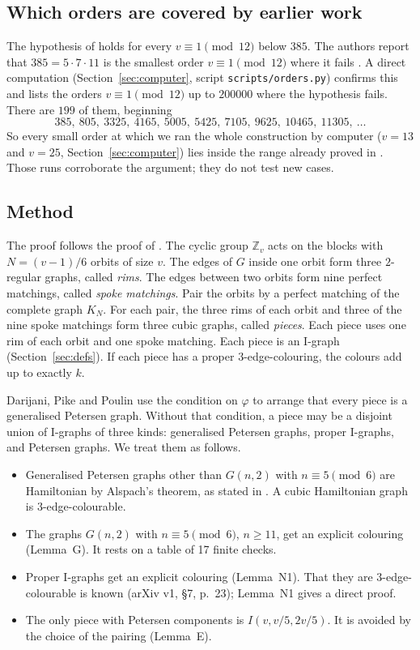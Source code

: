 \documentclass[11pt]{amsart}
\theoremstyle{plain}
\theoremstyle{definition}
\theoremstyle{remark}
\numberwithin{equation}{section}
\newcommand{\Z}{\mathbb{Z}}
\begin{document}
\subsection{Which orders are covered by earlier work}

The hypothesis of \cite[Theorem~3.1]{DPP} holds for every \(v\equiv1\pmod{12}\) below \(385\). The authors report that \(385=5\cdot7\cdot11\) is the smallest order \(v\equiv1\pmod{12}\) where it fails \cite[\S3]{DPP}. A direct computation (Section~\ref{sec:computer}, script \nolinkurl{scripts/orders.py}) confirms this and lists the orders \(v\equiv 1\pmod{12}\) up to \(200000\) where the hypothesis fails. There are \(199\) of them, beginning
\[
385,\ 805,\ 3325,\ 4165,\ 5005,\ 5425,\ 7105,\ 9625,\ 10465,\ 11305,\ \dots
\]
So every small order at which we ran the whole construction by computer (\(v=13\) and \(v=25\), Section~\ref{sec:computer}) lies inside the range already proved in \cite{DPP}. Those runs corroborate the argument; they do not test new cases.

\subsection{Method}

The proof follows the proof of \cite[Theorem~3.1]{DPP}. The cyclic group \(\Z_v\) acts on the blocks with \(N=(v-1)/6\) orbits of size \(v\). The edges of \(G\) inside one orbit form three \(2\)-regular graphs, called \emph{rims}. The edges between two orbits form nine perfect matchings, called \emph{spoke matchings}. Pair the orbits by a perfect matching of the complete graph \(K_N\). For each pair, the three rims of each orbit and three of the nine spoke matchings form three cubic graphs, called \emph{pieces}. Each piece uses one rim of each orbit and one spoke matching. Each piece is an I-graph (Section~\ref{sec:defs}). If each piece has a proper \(3\)-edge-colouring, the colours add up to exactly \(k\).

Darijani, Pike and Poulin use the condition on \(\varphi\) to arrange that every piece is a generalised Petersen graph. Without that condition, a piece may be a disjoint union of I-graphs of three kinds: generalised Petersen graphs, proper I-graphs, and Petersen graphs. We treat them as follows.
\begin{itemize}
\item Generalised Petersen graphs other than \(G(n,2)\) with \(n\equiv5\pmod6\) are Hamiltonian by Alspach's theorem, as stated in \cite[Theorem~1.1]{BP}. A cubic Hamiltonian graph is \(3\)-edge-colourable.
\item The graphs \(G(n,2)\) with \(n\equiv 5\pmod 6\), \(n\ge11\), get an explicit colouring (Lemma~G). It rests on a table of 17 finite checks.
\item Proper I-graphs get an explicit colouring (Lemma~N1). That they are \(3\)-edge-colourable is known \cite[\S7, p.~20]{BP} (arXiv v1, \S7, p.~23); Lemma~N1 gives a direct proof.
\item The only piece with Petersen components is \(I(v,v/5,2v/5)\). It is avoided by the choice of the pairing (Lemma~E).
\end{itemize}
\end{document}
